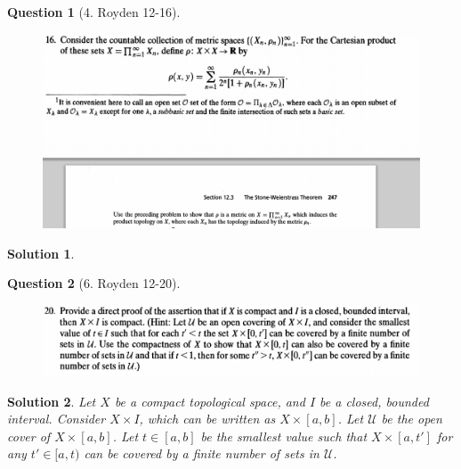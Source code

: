 \documentclass{article} %
\theoremstyle{quest}
\newtheorem*{question}{Question}
\newtheorem*{solution}{Solution}
\begin{document}
\newpage

\begin{question}[4. Royden 12-16]
\hfill
\begin{figure}[h!]
  \centering
    \includegraphics[width=1\textwidth]{12-16}
\end{figure}
\end{question}
\begin{solution}
\end{solution}

\pagebreak

\begin{question}[6. Royden 12-20]
\hfill
\begin{figure}[h!]
  \centering
    \includegraphics[width=1\textwidth]{12-20}
\end{figure}
\end{question}
\begin{solution}
Let $X$ be a compact topological space, and $I$ be a closed, bounded
interval. Consider $X \times I$, which can be written as $X \times [a,b]$.
Let $\mathscr{U}$ be the open cover of $X \times [a,b]$. Let $t \in [a,b]$
be the smallest value such that $X \times [a,t']$ for any $t' \in
[a,t)$ can be covered by a finite number of sets in $\mathscr{U}$. 
\end{solution}
\end{document}

